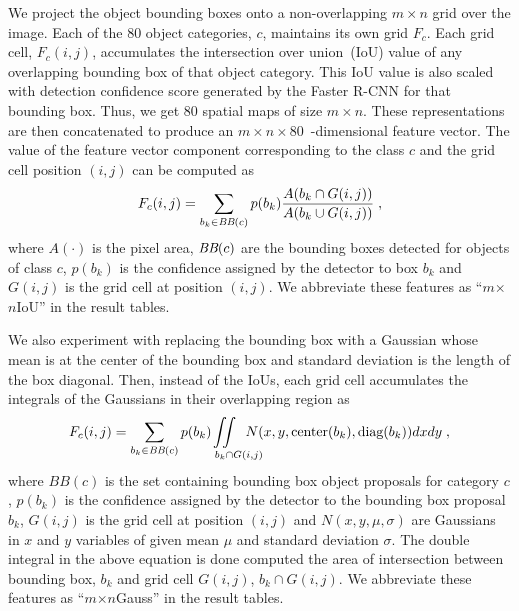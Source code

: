We project the object bounding boxes onto a non-overlapping $m \times n$ grid
over the image.
Each of the 80 object categories, $c$, maintains its own grid $F_c$.
Each grid cell, $F_c(i,j)$, accumulates the intersection over union~(IoU) value
of any overlapping bounding box of that object category. 
This IoU value is also scaled with detection confidence score generated by the
Faster R-CNN for that bounding box.
Thus, we get 80 spatial maps of size $m\times n$. 
These representations are then concatenated to produce an $m\times
n\times80$~-dimensional feature vector.
The value of the feature vector component corresponding to the class $c$ and the
grid cell position $(i,j)$ can be computed as 
\begin{equation} 
\label{eqn:Iou} 
F_c(i,j) = \sum_{b_k \in \text{\it BB}(c)}p(b_k)\frac{ A(b_k \cap G(i,j))}{A(b_k \cup G(i,j))} \;, 
\end{equation}
where $A(\cdot)$ is the pixel area, $\text{\it BB}(c)$ are the bounding boxes
detected for objects of class $c$, $p(b_k)$ is the confidence assigned by the
detector to box $b_k$ and $G(i,j)$ is the grid cell at position $(i,j)$.
We abbreviate these features as ``$m$$\times${}$n$IoU'' in the result tables.

We also experiment with replacing the bounding box with a Gaussian whose mean is
at the center of the bounding box and standard deviation is the length of the
box diagonal.
Then, instead of the IoUs, each grid cell accumulates the integrals of the
Gaussians in their overlapping region as
\begin{equation} \label{eqn:Gauss} F_c(i,j) = \sum_{b_k \in \text{\it
        BB}(c)} p(b_k)\text{\hspace*{-7mm}}\iint\displaylimits_%
{\text{\hspace{9mm}}b_k \cap G(i,j)}\text{\hspace*{-5mm}}
N(x,y,\text{center}(b_k),\text{diag}(b_k)) dx dy \; , \end{equation}
\noindent where $BB(c)$ is the set containing bounding box object proposals for
category $c$, $p(b_k)$ is the confidence assigned by the detector to the
bounding box proposal $b_k$, $G(i,j)$ is the grid cell at position $(i,j)$ and
$N(x,y,\mu,\sigma)$ are Gaussians in $x$ and $y$ variables of given mean $\mu$
and standard deviation $\sigma$.
The double integral in the above equation is done computed the area of intersection
between bounding box, $b_k$ and grid cell $G(i,j)$, $b_k \cap G(i,j)$.
We abbreviate these features as ``$m$$\times${}$n$Gauss'' in the result tables.

